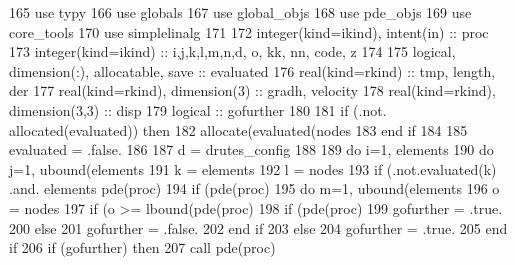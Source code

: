 \begin{DoxyCode}
165     \textcolor{keywordtype}{use }typy
166     \textcolor{keywordtype}{use }globals
167     \textcolor{keywordtype}{use }global_objs
168     \textcolor{keywordtype}{use }pde_objs
169     \textcolor{keywordtype}{use }core_tools
170     \textcolor{keywordtype}{use }simplelinalg
171 
172     \textcolor{keywordtype}{integer(kind=ikind)}, \textcolor{keywordtype}{intent(in)} :: proc
173     \textcolor{keywordtype}{integer(kind=ikind)} :: i,j,k,l,m,n,d, o, kk, nn, code, z
174    
175     \textcolor{keywordtype}{logical}, \textcolor{keywordtype}{dimension(:)}, \textcolor{keywordtype}{allocatable}, \textcolor{keywordtype}{save} :: evaluated
176     \textcolor{keywordtype}{real(kind=rkind)} :: tmp, length, der
177     \textcolor{keywordtype}{real(kind=rkind)}, \textcolor{keywordtype}{dimension(3)} :: gradh, velocity
178     \textcolor{keywordtype}{real(kind=rkind)}, \textcolor{keywordtype}{dimension(3,3)} :: disp
179     \textcolor{keywordtype}{logical} :: gofurther
180 
181     \textcolor{keywordflow}{if} (.not. \textcolor{keyword}{allocated}(evaluated)) \textcolor{keywordflow}{then}
182       \textcolor{keyword}{allocate}(evaluated(nodes%
183 \textcolor{keywordflow}{    end if}
184 
185     evaluated = .false.
186 
187     d = drutes_config%
188 
189     \textcolor{keywordflow}{do} i=1, elements%
190       \textcolor{keywordflow}{do} j=1, ubound(elements%
191         k = elements%
192         l = nodes%
193         \textcolor{keywordflow}{if} (.not.evaluated(k) .and. elements%
      pde(proc)%
194           \textcolor{keywordflow}{if} (pde(proc)%
195             \textcolor{keywordflow}{do} m=1, ubound(elements%
196               o = nodes%
197               \textcolor{keywordflow}{if} (o >= lbound(pde(proc)%
198                 \textcolor{keywordflow}{if} (pde(proc)%
199                   gofurther = .true.
200                 \textcolor{keywordflow}{else}
201                   gofurther = .false.
202 \textcolor{keywordflow}{                end if}
203               \textcolor{keywordflow}{else}
204                 gofurther = .true.
205 \textcolor{keywordflow}{              end if}
206               \textcolor{keywordflow}{if} (gofurther) \textcolor{keywordflow}{then}
207                 \textcolor{keyword}{call }pde(proc)%

\end{DoxyCode}
